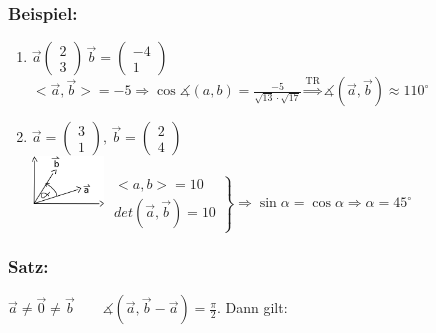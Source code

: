 \subsubsection{Beispiel:}
\begin{enumerate}
	\item $\vec{a}\begin{pmatrix}2\\3\end{pmatrix} \, \vec{b}=
	\begin{pmatrix}-4\\1\end{pmatrix}$ \\
	$<\vec{a},\vec{b}>=-5\Rightarrow\cos\measuredangle(a,b)=\frac{-5}
	{\sqrt{13}\cdot\sqrt{17}} \mathop{\Rightarrow}\limits^{\text{TR}}\measuredangle
	(\vec{a},\vec{b})\approx110^{\circ}$
	\item $\vec{a}=\begin{pmatrix} 3 \\ 1 \end{pmatrix}, \, \vec{b}=\begin{pmatrix}2 \\ 4 
	\end{pmatrix}$\\
	\includegraphics[width=0.15\textwidth]{mainmatter/chapter1/pics/trigo2.png}
	$
	\left.
	\begin{array}{cc}
	<a,b>=10 \\
	det(\vec{a},\vec{b})=10
	\end{array}
	\right\} 
	\Rightarrow \sin\alpha=\cos\alpha \Rightarrow \alpha = 45^{\circ}$
\end{enumerate}
%
%
%
\subsubsection{Satz:}	
$\vec{a} \neq \vec{0} \neq \vec{b} \qquad \measuredangle(\vec{a},\vec{b}-\vec{a})=\frac{\pi}{2}$. Dann gilt:\\


